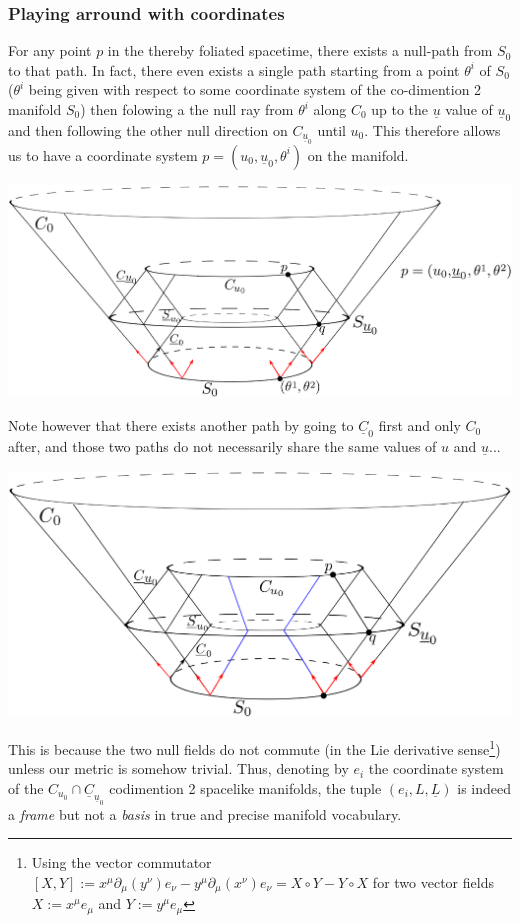 \documentclass[a4paper,11pt]{article}
\numberwithin{equation}{section}
\theoremstyle{definition}
\begin{document}
\subsubsection{Playing arround with coordinates}\label{TorsionWarning}
For any point $p$ in the thereby foliated spacetime, there exists a null-path from $S_0$ to that path. In fact, there even exists a single path starting from a point $\theta^i$ of $S_0$ ($\theta^i$ being given with respect to some coordinate system of the co-dimention 2 manifold $S_0$) then folowing a the null ray from $\theta^i$ along $C_0$ up to the $\underline{u}$ value of $\underline{u}_0$ and then following the other null direction on $C_{\underline{u}_0}$ until $u_0$. This therefore allows us to have a coordinate system $p=(u_0, \underline{u}_0, \theta^i)$ on the manifold.
\begin{center}
    \includegraphics [width=0.75\linewidth] {Pictures/04_Coordinates.png}
\end{center}

Note however that there exists another path by going to $\underline{C}_0$ first and only $C_0$ after, and those two paths do not necessarily share the same values of $u$ and $\underline{u}$... 
\begin{center}
    \includegraphics [width=0.75\linewidth] {Pictures/05_Torsion.png}
\end{center}

This is because the two null fields do not commute (in the Lie derivative sense\footnote{Using the vector commutator $[X,Y]:=x^\mu \partial_\mu (y^\nu) e_\nu - y^\mu \partial_\mu (x^\nu) e_\nu = X\circ Y - Y \circ X$ for two vector fields $X:=x^\mu e_\mu$ and $Y:=y^\mu e_\mu$}) unless our metric is somehow trivial. Thus, denoting by $e_i$ the coordinate system of the $C_{u_0}\cap\underline{C}_{\underline{u}_0}$ codimention 2 spacelike manifolds, the tuple $(e_i, L, \underline{L})$ is indeed a \emph{frame} but not a \emph{basis} in true and precise manifold vocabulary.
\end{document}
